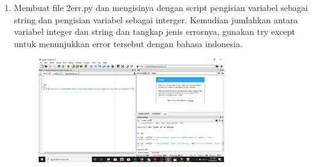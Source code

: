 \begin{enumerate}
\item
Membuat file 2err.py dan mengisinya dengan script pengisian variabel sebagai string dan pengisian variabel sebagai interger. 
Kemudian jumlahkan antara variabel integer dan string dan tangkap jenis errornya, gunakan try except untuk menunjukkan error tersebut dengan
bahasa indonesia.
\begin{figure}[h]
\centerline{\includegraphics[width=8cm]{gambar/2err.png}}
\end{figure}


\end{enumerate}